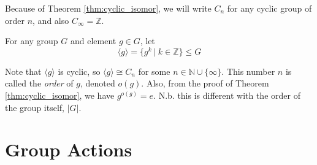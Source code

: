\documentclass[10pt, a4paper, twoside]{report}
\begin{document}
Because of Theorem \ref{thm:cyclic_isomor}, we will write \(C_n\) for any cyclic group of order \(n\), and also \(C_\infty=\mathbb{Z}\).
\begin{definition}
    For any group \(G\) and element \(g\in G\), let
    \[\langle g\rangle=\{g^k\:|\:k\in\mathbb{Z}\}\leq G\]
\end{definition}
Note that \(\langle g\rangle\) is cyclic, so \(\langle g\rangle\cong C_n\) for some \(n\in\mathbb{N}\cup\{\infty\}\). This number \(n\) is called the \emph{order} of \(g\), denoted \(o(g)\). Also, from the proof of Theorem \ref{thm:cyclic_isomor}, we have \(g^{o(g)}=e\). N.b. this is different with the order of the group itself, \(|G|\). 
\section{Group Actions}
\end{document}
